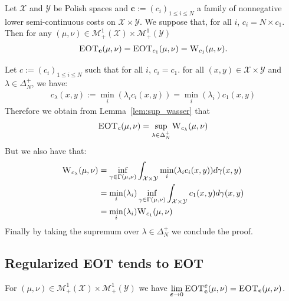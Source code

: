 \begin{prop}
Let $\mathcal{X}$ and $\mathcal{Y}$ be Polish spaces and $\mathbf{c}:=(c_i)_{1\leq i\leq N}$ a family of nonnegative lower semi-continuous costs on $\mathcal{X}\times \mathcal{Y}$. We suppose that, for all $i$, $c_i= N\times c_1$. Then for any $(\mu,\nu)\in\mathcal{M}_+^{1}(\mathcal{X})\times\mathcal{M}_+^{1}(\mathcal{Y})$  
\begin{align}
    \textsc{EOT}_{\mathbf{c}}(\mu,\nu)=\textsc{EOT}_{c_1}(\mu,\nu)=\textsc{W}_{c_1}(\mu,\nu).
\end{align}
\end{prop}
\begin{prv*}
Let $c:=(c_i)_{1\leq i\leq N}$ such that for all $i$, $c_i=c_1$. for all $(x,y)\in\mathcal{X}\times \mathcal{Y}$ and $\lambda\in\Delta^+_N$, we have:
\begin{align*}
    c_\lambda(x,y):=\min_i(\lambda_i c_i(x,y)) = \min_i(\lambda_i)c_1(x,y)
\end{align*}
Therefore we obtain from Lemma~\ref{lem:sup_wasser} that
\begin{align}
    \textsc{EOT}_{c}(\mu,\nu)=\sup_{\lambda\in\Delta^+_N} \textsc{W}_{c_\lambda}(\mu,\nu)
\end{align}
But we also have that:
\begin{align*}
    \textsc{W}_{c_\lambda}(\mu,\nu)&=\inf_{\gamma\in\Gamma(\mu,\nu)}\int_{\mathcal{X}\times \mathcal{Y}} \min_i(\lambda_i c_i(x,y))d\gamma(x,y)\\
    &=\min_i(\lambda_i )\inf_{\gamma\in\Gamma(\mu,\nu)}\int_{\mathcal{X}\times \mathcal{Y}} c_1(x,y) d\gamma(x,y)\\
    &=\min_i(\lambda_i )  \textsc{W}_{c_1}(\mu,\nu)
\end{align*}
Finally by taking the supremum over $\lambda\in\Delta^+_N$ we conclude the proof.
\end{prv*}

\subsection{Regularized EOT tends to EOT}
\label{res:epsto0}

\begin{prop}
\label{prop:epsto0}
For $(\mu,\nu)\in\mathcal{M}_+^{1}(\mathcal{X})\times\mathcal{M}_+^{1}(\mathcal{Y})$ we have $  \lim\limits_{\bm{\varepsilon}\to0} \textsc{EOT}_{\mathbf{c}}^{\bm{\varepsilon}}(\mu,\nu) = \textsc{EOT}_{\mathbf{c}}(\mu,\nu)$.
\end{prop}


